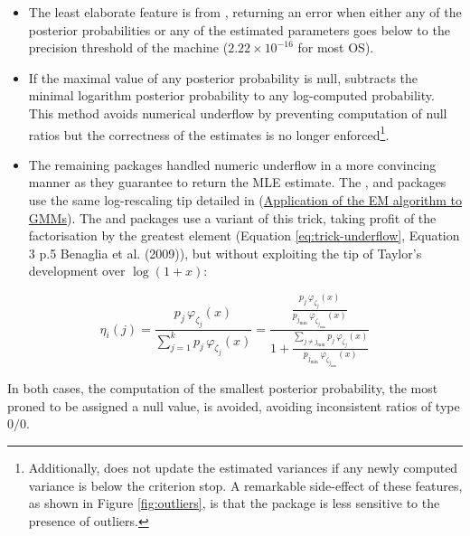 \begin{enumerate}
  \begin{itemize}
  \item
    The least elaborate feature is from , returning an error when either any of the posterior probabilities or any of the estimated parameters goes below to the precision threshold of the machine (\ensuremath{2.22\times 10^{-16}} for most OS).
  \item
    If the maximal value of any posterior probability is null,  subtracts the minimal logarithm posterior probability to any log-computed probability. This method avoids numerical
    underflow by preventing computation of null ratios but the correctness of the estimates is no longer enforced\footnote{Additionally,  does
      not update the estimated variances if any newly computed variance is
      below the criterion stop. A remarkable side-effect of these features, as
      shown in Figure \ref{fig:outliers}, is that the  package is
      less sensitive to the presence of outliers.}.
  \item
    The remaining packages handled numeric underflow in a more convincing
    manner as they guarantee to return the MLE estimate. The ,  and 
    packages use the same log-rescaling tip detailed in (\protect\hyperlink{application-of-the-em-algorithm-to-gmms}{Application of the EM algorithm to GMMs}). The  and
     packages use a variant of this trick, taking profit of the factorisation
    by the greatest element (Equation \eqref{eq:trick-underflow}, Equation 3 p.5 Benaglia et al. (2009)), but without exploiting the tip of Taylor's development over \(\log(1+x)\):
  \end{itemize}
\end{enumerate}

\begin{equation}
\eta_{i} (j) = \frac{p_{j} \, \varphi_{\zeta_j} (x)}{\sum_{j=1}^k p_{j} \, \varphi_{\zeta_j} (x)}=\frac{\frac{p_{j} \, \varphi_{\zeta_j} (x)}{p_{j_{\min}} \, \varphi_{\zeta_{j_{\min}}} (x)}}{1+ \frac{\sum_{j\neq j_{\min}} p_{j} \, \varphi_{\zeta_j} (x)}{p_{j_{\min}} \, \varphi_{\zeta_{j_{\min}}} (x)}}
    \label{eq:trick-underflow}
\end{equation}

In both cases, the computation of the smallest posterior probability, the most proned to be assigned a null value, is avoided, avoiding inconsistent ratios of type \(0/0\).

